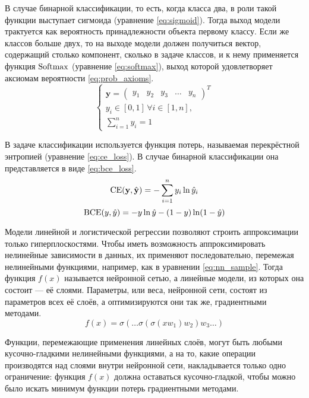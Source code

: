 В случае бинарной классификации, то есть, когда класса два, в роли такой функции выступает сигмоида (уравнение \ref*{eq:sigmoid}). Тогда выход модели трактуется как вероятность принадлежности объекта первому классу. Если же классов больше двух, то на выходе модели должен получиться вектор, содержащий столько компонент, сколько в задаче классов, и к нему применяется функция $\operatorname{Softmax}$ (уравнение \ref*{eq:softmax}), выход которой удовлетворяет аксиомам вероятности \ref*{eq:prob_axioms}.
\begin{equation}
    \label{eq:prob_axioms}
    \begin{cases}
        \mathbf{y}=\left(\begin{matrix}
            y_1 & y_2 & y_3 & \dots & y_n
        \end{matrix}\right)^T \\
        y_i \in [0, 1]\,\forall i\in[1, n], \\
        \sum\limits_{i=1}^n y_i = 1
    \end{cases}
\end{equation}

В задаче классификации используется функция потерь, называемая перекрёстной энтропией (уравнение \ref*{eq:ce_loss}). В случае бинарной классификации она представляется в виде \ref*{eq:bce_loss}.
\begin{equation}
    \label{eq:ce_loss}
    \operatorname{CE}(\mathbf{y},\hat{\mathbf{y}})=-\sum\limits_{i=1}^n y_i \ln \hat{y}_i
\end{equation}
\begin{equation}
    \label{eq:bce_loss}
    \operatorname{BCE}(y,\hat{y})=-y \ln \hat{y} - (1-y)\ln (1-\hat{y})
\end{equation}

Модели линейной и логистической регрессии позволяют строить аппроксимации только гиперплоскостями. Чтобы иметь возможность аппроксимировать нелинейные зависимости в данных, их применяют последовательно, перемежая нелинейными функциями, например, как в уравнении \ref*{eq:nn_sample}. Тогда функция $f(x)$ называется нейронной сетью, а линейные модели, из которых она состоит --- её слоями. Параметры, или веса, нейронной сети, состоят из параметров всех её слоёв, а оптимизируются они так же, градиентными методами.
\begin{equation}
    \label{eq:nn_sample}
    f(x)=\sigma(\dots \sigma(\sigma(xw_1)w_2)w_3 \dots)
\end{equation}

Функции, перемежающие применения линейных слоёв, могут быть любыми кусочно-гладкими нелинейными функциями, а на то, какие операции производятся над слоями внутри нейронной сети, накладывается только одно ограничение: функция $f(x)$ должна оставаться кусочно-гладкой, чтобы можно было искать минимум функции потерь градиентными методами.